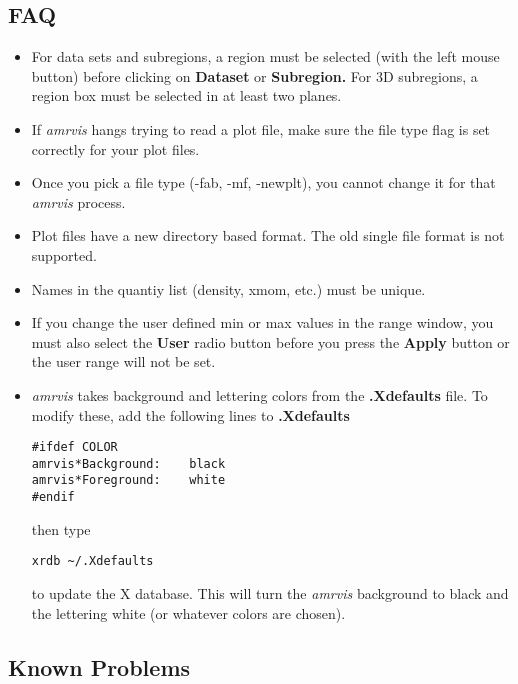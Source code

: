 \documentclass{article}
\begin{document}
\subsection{FAQ}

\begin{itemize}

\item For data sets and subregions, a region must be selected (with
the left mouse button) before clicking on {\bf Dataset} or {\bf Subregion.}
For 3D subregions, a region box must be selected in at least two planes.
    
\item If {\em amrvis} hangs trying to read a plot file, make sure the file type
flag is set correctly for your plot files.

\item Once you pick a file type (-fab, -mf, -newplt), you cannot
change it for that {\em amrvis} process.

\item Plot files have a new directory based format.  The old single file
format is not supported.

\item Names in the quantiy list (density, xmom, etc.) must be unique.

\item If you change the user defined min or max values in the range
window, you must also select the {\bf User} radio button before you
press the {\bf Apply} button or the user range will not be set.

\item {\em amrvis} takes background and lettering colors from
the {\bf .Xdefaults} file.
To modify these, add the following lines to {\bf .Xdefaults}

\begin{verbatim}
#ifdef COLOR
amrvis*Background:    black
amrvis*Foreground:    white
#endif
\end{verbatim}

then type

\begin{verbatim}
xrdb ~/.Xdefaults
\end{verbatim}

to update the X database.  This will turn the {\em amrvis} background to black
and the lettering white (or whatever colors are chosen).

\end{itemize}


\subsection{Known Problems}
\end{document}
